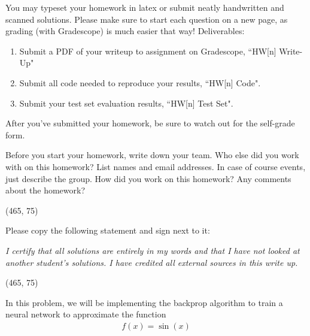 
You may typeset your homework in latex or submit neatly handwritten and scanned solutions. Please make sure to start each question on a new page, as grading (with Gradescope) is much easier that way! Deliverables:

\begin{enumerate}
  \item Submit a PDF of your writeup to assignment on Gradescope, ``HW[n] Write-Up"
  \item Submit all code needed to reproduce your results, ``HW[n] Code".
  \item Submit your test set evaluation results, ``HW[n] Test Set".
\end{enumerate}

After you've submitted your homework, be sure to watch out for the self-grade form.

\begin{Parts}

\Part Before you start your homework, write down your team. Who else did you work with on this homework? List names and email addresses. In case of course events, just describe the group. How did you work on this homework? Any comments about the homework?

\vspace{15pt}
\framebox(465, 75){}

\Part Please copy the following statement and sign next to it:

\textit{I certify that all solutions are entirely in my words and that I have not looked at another student's solutions. I have credited all external sources in this write up.}

\vspace{15pt}
\framebox(465, 75){}

\end{Parts}

\pagebreak


In this problem, we will be implementing the backprop algorithm to train a neural network to approximate the function
\begin{align*}
f(x) = \sin(x)
\end{align*}

